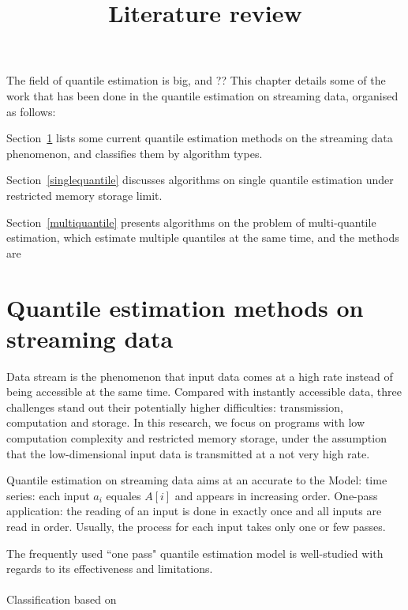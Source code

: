 \documentclass[12pt]{article}
\title{Literature review}
\date{\vspace{-5ex}}
\begin{document}
\maketitle

The field of quantile estimation is big, and ??
This chapter details some of the work that has been done in the quantile estimation on streaming data, organised as follows:

Section~\ref{streamingdata} lists some current quantile estimation methods on the streaming data phenomenon, and classifies them by algorithm types. 

Section~\ref{singlequantile} discusses algorithms on single quantile estimation under restricted memory storage limit.

Section~\ref{multiquantile} presents algorithms on the problem of multi-quantile estimation, which estimate multiple quantiles at the same time, and the methods are 

   \section{Quantile estimation methods on streaming data}
   \label{streamingdata}
   Data stream is the phenomenon that input data comes at a high rate instead of being accessible at the same time. Compared with instantly accessible data, three challenges stand out their potentially higher difficulties: transmission, computation and storage\cite{muthukrishnanDataStreamsAlgorithms2005}. 
   In this research, we focus on programs with low computation complexity and restricted memory storage, under the assumption that the low-dimensional input data is transmitted at a not very high rate.
   
   Quantile estimation on streaming data aims at an accurate to the 
   Model: time series: each input $a_i$ equales $A[i]$ and appears in increasing order.
   One-pass application: the reading of an input is done in exactly once and all inputs are read in order. Usually, the process for each input takes only one or few passes. 

   The frequently used ``one pass" quantile estimation model is well-studied with regards to its effectiveness and limitations.
    \\\\
    Classification based on \cite{buragohainQuantilesStreams2009}
\end{document}
